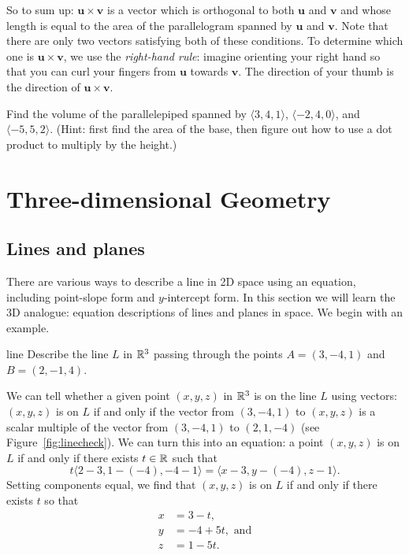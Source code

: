 \documentclass[svgnames]{watsonbook}
\begin{document}
So to sum up: $\mathbf{u}  \times \mathbf{v}$ is a vector which is
orthogonal to both $\mathbf{u}$ and $\mathbf{v}$ and whose length
is equal to the area of the parallelogram spanned by $\mathbf{u}$ and
$\mathbf{v}$. Note that there are only two vectors satisfying both of
these conditions. To determine which one is $\mathbf{u}  \times
\mathbf{v}$, we use the \textit{right-hand rule}: imagine orienting
your right hand so that you can curl your fingers from $\mathbf{u}$
towards $\mathbf{v}$. The direction of your thumb is the direction of
$\mathbf{u} \times \mathbf{v}$. 

\begin{exercise}{}{}
  Find the volume of the parallelepiped spanned by
  $\langle 3,4,1 \rangle$,  $\langle -2,4,0 \rangle$, and 
  $\langle -5,5,2 \rangle$. (Hint: first find the area of the base,
  then figure out how to use a   dot product to multiply by the height.)
\end{exercise}

\chapter{Three-dimensional Geometry}

\section{Lines and planes} \label{sec:lines_and_planes} 
  
There are various ways to describe a line in 2D space using an
equation, including point-slope form and $y$-intercept form. In this
section we will learn the 3D analogue: equation descriptions of lines
and planes in space. We begin with an example.

\begin{example}{}{line}
  Describe the line $L$ in $\mathbb{R}^3$ passing through the points $A = (3,-4,1)$ and
$B = (2,-1,4)$. 
\end{example}

\begin{solution}
  We can tell whether a given point $(x,y,z)$ in $\mathbb{R}^3$ is on the line
  $L$ using vectors: $(x,y,z)$ is on $L$ if and only if the vector
  from $(3,-4,1)$ to $(x,y,z)$ is a scalar multiple of the vector from
  $(3,-4,1)$ to $(2,1,-4)$ (see Figure~\ref{fig:linecheck}). We can
  turn this into an equation: a point $(x,y,z)$ is on $L$ if and only
  if there exists $t\in \mathbb{R}$ such that
  \[
    t \big\langle 2-3, 1-(-4), -4-1\big\rangle = \big\langle x - 3, y -(-4), z -
    1\big\rangle. 
  \]
  Setting components equal, we find that $(x,y,z)$ is on $L$ if and
  only if there exists $t$ so that 
  \begin{align} \nonumber 
    x &= 3 - t, \\ \label{eq:par}
    y &= -4 +5t, \text{ and} \\  \nonumber 
    z &= 1 - 5t.
  \end{align}
\end{solution}
\end{document}
